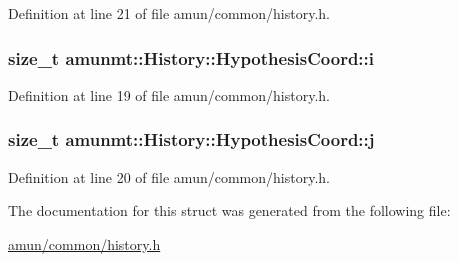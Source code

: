 Definition at line 21 of file amun/common/history.\+h.

\subsubsection[{\texorpdfstring{i}{i}}]{\setlength{\rightskip}{0pt plus 5cm}size\+\_\+t amunmt\+::\+History\+::\+Hypothesis\+Coord\+::i}\hypertarget{structamunmt_1_1History_1_1HypothesisCoord_ad8a53a619db520aa979d7af8cd77a744}{}\label{structamunmt_1_1History_1_1HypothesisCoord_ad8a53a619db520aa979d7af8cd77a744}


Definition at line 19 of file amun/common/history.\+h.

\subsubsection[{\texorpdfstring{j}{j}}]{\setlength{\rightskip}{0pt plus 5cm}size\+\_\+t amunmt\+::\+History\+::\+Hypothesis\+Coord\+::j}\hypertarget{structamunmt_1_1History_1_1HypothesisCoord_a0c21abf89842a2cbc9d52b47e587c8be}{}\label{structamunmt_1_1History_1_1HypothesisCoord_a0c21abf89842a2cbc9d52b47e587c8be}


Definition at line 20 of file amun/common/history.\+h.



The documentation for this struct was generated from the following file\+:\begin{DoxyCompactItemize}
\item 
\hyperlink{amun_2common_2history_8h}{amun/common/history.\+h}\end{DoxyCompactItemize}
